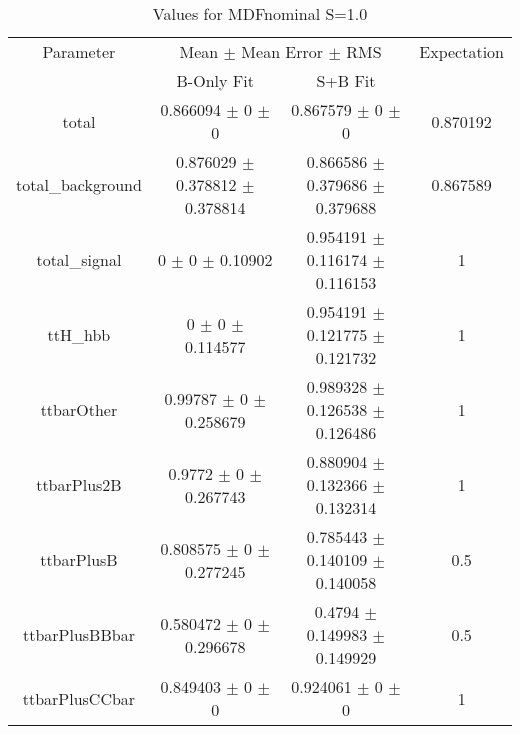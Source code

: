 \begin{table}
\centering
\caption{Values for MDFnominal S=1.0}
\begin{tabular}{cccc}
\toprule
Parameter & \multicolumn{2}{c}{Mean $\pm$ Mean Error $\pm$ RMS} & Expectation\\
 & B-Only Fit & S+B Fit & \\
\midrule
total & \num{0.866094} $\pm$ \num{0} $\pm$ \num{0} & \num{0.867579} $\pm$ \num{0} $\pm$ \num{0} & \num{0.870192}\\
total\_background & \num{0.876029} $\pm$ \num{0.378812} $\pm$ \num{0.378814} & \num{0.866586} $\pm$ \num{0.379686} $\pm$ \num{0.379688} & \num{0.867589}\\
total\_signal & \num{0} $\pm$ \num{0} $\pm$ \num{0.10902} & \num{0.954191} $\pm$ \num{0.116174} $\pm$ \num{0.116153} & \num{1}\\
ttH\_hbb & \num{0} $\pm$ \num{0} $\pm$ \num{0.114577} & \num{0.954191} $\pm$ \num{0.121775} $\pm$ \num{0.121732} & \num{1}\\
ttbarOther & \num{0.99787} $\pm$ \num{0} $\pm$ \num{0.258679} & \num{0.989328} $\pm$ \num{0.126538} $\pm$ \num{0.126486} & \num{1}\\
ttbarPlus2B & \num{0.9772} $\pm$ \num{0} $\pm$ \num{0.267743} & \num{0.880904} $\pm$ \num{0.132366} $\pm$ \num{0.132314} & \num{1}\\
ttbarPlusB & \num{0.808575} $\pm$ \num{0} $\pm$ \num{0.277245} & \num{0.785443} $\pm$ \num{0.140109} $\pm$ \num{0.140058} & \num{0.5}\\
ttbarPlusBBbar & \num{0.580472} $\pm$ \num{0} $\pm$ \num{0.296678} & \num{0.4794} $\pm$ \num{0.149983} $\pm$ \num{0.149929} & \num{0.5}\\
ttbarPlusCCbar & \num{0.849403} $\pm$ \num{0} $\pm$ \num{0} & \num{0.924061} $\pm$ \num{0} $\pm$ \num{0} & \num{1}\\
\bottomrule
\end{tabular}
\end{table}